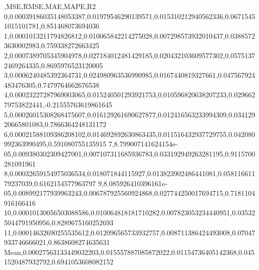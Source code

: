 ,MSE,RMSE,MAE,MAPE,R2
0,0.00039186035148053387,0.01979546290139571,0.015310212940562336,0.06715451015101781,0.851468073694036
1,0.0001013211794826812,0.010065842214275028,0.007298573932010437,0.03885723630002983,0.759338272663425
2,0.0007389705345904978,0.027184012481429185,0.020432103609577302,0.05751372469264335,0.8695976523120005
3,0.0006240485392364731,0.024980963536990985,0.0167440819327661,0.047567924483476305,0.7479764662676538
4,0.00023227287969003065,0.015240501293921753,0.010596820638207233,0.02966279753822441,-0.21555763619861645
5,0.00026015308268475607,0.016129261690627877,0.012416563233994309,0.03412920665801083,0.7866364248131172
6,0.00021588109386208102,0.014692892630863435,0.011516432937729755,0.042080992363990495,0.591080755135915
7,8.799007141624154e-05,0.009380302309427001,0.007107311685936783,0.033192949263281195,0.9115700281091961
8,0.00032659154975036534,0.018071844115927,0.013823902486441081,0.05811661179237039,0.6162154577963797
9,8.085926410396161e-05,0.008992177939963243,0.006787925560924868,0.027744250017694715,0.7181104916166416
10,0.00010130056503088586,0.010064818181710282,0.007823053234440951,0.035325044791950956,0.8289675160252693
11,0.00014632690255535612,0.012096565733932757,0.008711386424493008,0.07047933746666021,0.8638608274635631
Mean,0.00027563133449032203,0.015557887085872022,0.01154736405142368,0.0451520487932792,0.6941053608082152
